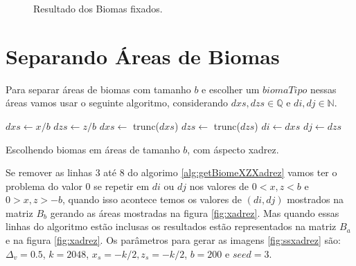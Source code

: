 \begin{figure}[H]
     \caption{Resultado dos Biomas fixados.}
     
     \label{fig:bssComBiomasFixados}
\end{figure}

\section{Separando Áreas de Biomas}
Para separar áreas de biomas com tamanho $b$ e escolher um $biomaTipo$ nessas áreas
vamos usar o seguinte algoritmo, considerando $dxs, dzs \in \mathbb{Q}$ e $di, dj \in \mathbb{N}$.

\begin{algorithm}[H]\label{alg:getBiomeXZXadrez}
    $dxs \leftarrow x/b$\;
    $dzs \leftarrow z/b$\;
    $dxs \leftarrow$ trunc($dxs$)\;
    $dzs \leftarrow$ trunc($dzs$)\;
    $di \leftarrow dxs$\;
    $dj \leftarrow dzs$\;
    
    
    \caption{Escolhendo biomas em áreas de tamanho $b$, com áspecto xadrez.}
\end{algorithm}

Se remover as linhas 3 até 8 do algorimo \ref{alg:getBiomeXZXadrez} vamos ter o 
problema do valor $0$ se repetir em $di$ ou $dj$ nos valores de $0 < x, z < b$ e $0 > x, z > -b$, 
quando isso acontece temos os valores de $(di, dj)$ mostrados na
matriz $B_{b}$ gerando as áreas mostradas na figura \ref{fig:xadrez}. Mas quando essas
linhas do algoritmo estão inclusas os resultados estão representados na matriz $B_{a}$
e na figura \ref{fig:xadrez}. Os parâmetros para gerar as
imagens \ref{fig:ssxadrez} são: $\Delta_{v} = 0.5$, 
$k = 2048$, $ x_{s} = -k/2 , z_{s} = -k/2$, $b = 200$ e $seed = 3$.

